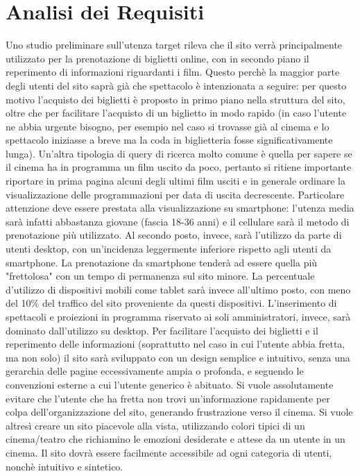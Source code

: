 \documentclass[a4paper, 12pt]{article}
\begin{document}
\section{Analisi dei Requisiti}
Uno studio preliminare sull'utenza target rileva che il sito verrà principalmente utilizzato per la prenotazione di biglietti online, con in secondo piano il reperimento di informazioni riguardanti i film.
Questo perchè la maggior parte degli utenti del sito saprà già che spettacolo è intenzionata a seguire: per questo motivo l'acquisto dei biglietti è proposto in primo piano nella struttura del sito, oltre che
per facilitare l'acquisto di un biglietto in modo rapido (in caso l'utente ne abbia urgente bisogno, per esempio nel caso si trovasse già al cinema e lo spettacolo iniziasse a breve ma la coda in biglietteria fosse
significativamente lunga).
Un'altra tipologia di query di ricerca molto comune è quella per sapere se il cinema ha in programma un film uscito da poco, pertanto si ritiene importante riportare in prima pagina alcuni degli ultimi film usciti e in generale ordinare la visualizzazione delle programmazioni per data di uscita decrescente.
Particolare attenzione deve essere prestata alla visualizzazione su smartphone: l'utenza media sarà infatti abbastanza giovane (fascia 18-36 anni) e il cellulare sarà il metodo di prenotazione
più utilizzato. Al secondo posto, invece, sarà l'utilizzo da parte di utenti desktop, con un'incidenza leggermente inferiore rispetto agli utenti da smartphone.
La prenotazione da smartphone tenderà ad essere quella più "frettolosa" con un tempo di permanenza sul sito minore.
La percentuale d'utilizzo di dispositivi mobili come tablet sarà invece all'ultimo posto, con meno del 10\% del traffico del sito proveniente da questi dispositivi.
L'inserimento di spettacoli e proiezioni in programma riservato ai soli amministratori, invece, sarà dominato dall'utilizzo su desktop.
Per facilitare l'acquisto dei biglietti e il reperimento delle informazioni (soprattutto nel caso in cui l'utente abbia fretta, ma non solo) il sito sarà sviluppato con un design semplice e intuitivo,
senza una gerarchia delle pagine eccessivamente ampia o profonda, e seguendo le convenzioni esterne a cui l'utente generico è abituato.
Si vuole assolutamente evitare che l'utente che ha fretta non trovi un'informazione rapidamente per colpa dell'organizzazione del sito, generando frustrazione verso il cinema.
Si vuole altresì creare un sito piacevole alla vista, utilizzando colori tipici di un cinema/teatro che richiamino le emozioni desiderate e attese da un utente in un cinema.
Il sito dovrà essere facilmente accessibile ad ogni categoria di utenti, nonchè intuitivo e sintetico.
\end{document}
